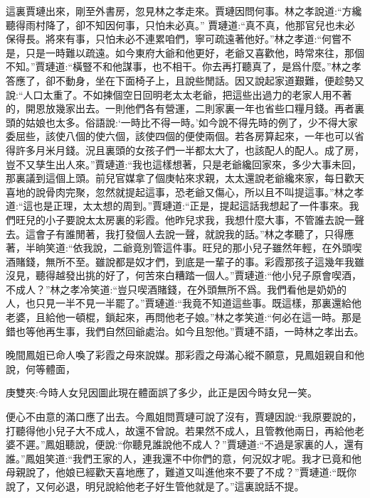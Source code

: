 \begin{parag}
    這裏賈璉出來，剛至外書房，忽見林之孝走來。賈璉因問何事。林之孝說道:“方纔聽得雨村降了，卻不知因何事，只怕未必真。” 賈璉道:“真不真，他那官兒也未必保得長。將來有事，只怕未必不連累咱們，寧可疏遠著他好。”林之孝道:“何嘗不是，只是一時難以疏遠。如今東府大爺和他更好，老爺又喜歡他，時常來往，那個不知。”賈璉道:“橫豎不和他謀事，也不相干。你去再打聽真了，是爲什麼。”林之孝答應了，卻不動身，坐在下面椅子上，且說些閒話。因又說起家道艱難，便趁勢又說:“人口太重了。不如揀個空日回明老太太老爺，把這些出過力的老家人用不著的，開恩放幾家出去。一則他們各有營運，二則家裏一年也省些口糧月錢。再者裏頭的姑娘也太多。俗語說:‘一時比不得一時。’如今說不得先時的例了，少不得大家委屈些，該使八個的使六個，該使四個的便使兩個。若各房算起來，一年也可以省得許多月米月錢。況且裏頭的女孩子們一半都太大了，也該配人的配人。成了房，豈不又孳生出人來。”賈璉道:“我也這樣想著，只是老爺纔回家來，多少大事未回，那裏議到這個上頭。前兒官媒拿了個庚帖來求親，太太還說老爺纔來家，每日歡天喜地的說骨肉完聚，忽然就提起這事，恐老爺又傷心，所以且不叫提這事。”林之孝道:“這也是正理，太太想的周到。”賈璉道:“正是，提起這話我想起了一件事來。我們旺兒的小子要說太太房裏的彩霞。他昨兒求我，我想什麼大事，不管誰去說一聲去。這會子有誰閒著，我打發個人去說一聲，就說我的話。”林之孝聽了，只得應著，半晌笑道:“依我說，二爺竟別管這件事。旺兒的那小兒子雖然年輕，在外頭喫酒賭錢，無所不至。雖說都是奴才們，到底是一輩子的事。彩霞那孩子這幾年我雖沒見，聽得越發出挑的好了，何苦來白糟踏一個人。”賈璉道:“他小兒子原會喫酒，不成人？”林之孝冷笑道:“豈只喫酒賭錢，在外頭無所不爲。我們看他是奶奶的人，也只見一半不見一半罷了。”賈璉道:“我竟不知道這些事。既這樣，那裏還給他老婆，且給他一頓棍，鎖起來，再問他老子娘。”林之孝笑道:“何必在這一時。那是錯也等他再生事，我們自然回爺處治。如今且恕他。”賈璉不語，一時林之孝出去。
\end{parag}


\begin{parag}
    晚間鳳姐已命人喚了彩霞之母來說媒。那彩霞之母滿心縱不願意，見鳳姐親自和他說，何等體面，\begin{note}庚雙夾:今時人女兒因圖此現在體面誤了多少，此正是因今時女兒一笑。\end{note}便心不由意的滿口應了出去。今鳳姐問賈璉可說了沒有，賈璉因說:“我原要說的，打聽得他小兒子大不成人，故還不曾說。若果然不成人，且管教他兩日，再給他老婆不遲。”鳳姐聽說，便說:“你聽見誰說他不成人？”賈璉道:“不過是家裏的人，還有誰。”鳳姐笑道:“我們王家的人，連我還不中你們的意，何況奴才呢。我才已竟和他母親說了，他娘已經歡天喜地應了，難道又叫進他來不要了不成？”賈璉道:“既你說了，又何必退，明兒說給他老子好生管他就是了。”這裏說話不提。
\end{parag}


